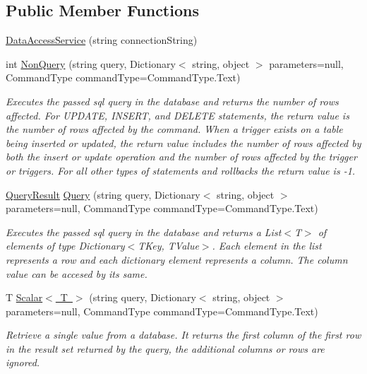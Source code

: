 \subsection*{Public Member Functions}
\begin{DoxyCompactItemize}
\item 
\mbox{\hyperlink{classDataBaseAccess_1_1DataAccessService_a1a8ce18984787ddbb8ecf1aa0a71b003}{Data\+Access\+Service}} (string connection\+String)
\item 
int \mbox{\hyperlink{classDataBaseAccess_1_1DataAccessService_ac0ccfab11b8a047d85096cdf188e8e2f}{Non\+Query}} (string query, Dictionary$<$ string, object $>$ parameters=null, Command\+Type command\+Type=Command\+Type.\+Text)
\begin{DoxyCompactList}\small\item\em Executes the passed sql query in the database and returns the number of rows affected. For U\+P\+D\+A\+TE, I\+N\+S\+E\+RT, and D\+E\+L\+E\+TE statements, the return value is the number of rows affected by the command. When a trigger exists on a table being inserted or updated, the return value includes the number of rows affected by both the insert or update operation and the number of rows affected by the trigger or triggers. For all other types of statements and rollbacks the return value is -\/1. \end{DoxyCompactList}\item 
\mbox{\hyperlink{classDataBaseAccess_1_1QueryResult}{Query\+Result}} \mbox{\hyperlink{classDataBaseAccess_1_1DataAccessService_a0a2cbe1a4d93a5d946e4ccdb8ac11523}{Query}} (string query, Dictionary$<$ string, object $>$ parameters=null, Command\+Type command\+Type=Command\+Type.\+Text)
\begin{DoxyCompactList}\small\item\em Executes the passed sql query in the database and returns a List$<$\+T$>$ of elements of type Dictionary$<$\+T\+Key, T\+Value$>$. Each element in the list represents a row and each dictionary element represents a column. The column value can be accesed by its same. \end{DoxyCompactList}\item 
T \mbox{\hyperlink{classDataBaseAccess_1_1DataAccessService_a422e6ead446da4cfcdc33255193ac92e}{Scalar$<$ T $>$}} (string query, Dictionary$<$ string, object $>$ parameters=null, Command\+Type command\+Type=Command\+Type.\+Text)
\begin{DoxyCompactList}\small\item\em Retrieve a single value from a database. It returns the first column of the first row in the result set returned by the query, the additional columns or rows are ignored. \end{DoxyCompactList}\end{DoxyCompactItemize}
